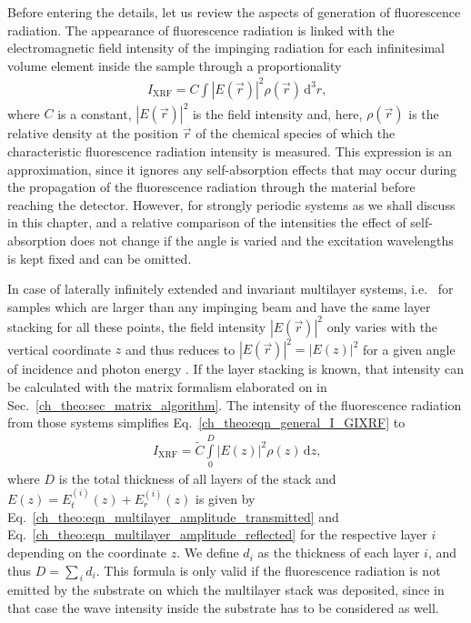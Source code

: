 Before entering the details, let us review the aspects of generation of fluorescence radiation. The appearance of fluorescence radiation is linked with the electromagnetic field intensity of the impinging radiation for each infinitesimal volume element inside the sample through a proportionality
\begin{align}
 I_\text{XRF} = C \int |E(\vec{r})|^2 \rho(\vec{r}) 
\,\text{d}^3 r \text{,} \label{ch_theo:eqn_general_I_GIXRF}
\end{align}
where $C$ is a constant, $|E(\vec{r})|^2$ is the field intensity and, here, $\rho(\vec{r})$ is the relative density at the position $\vec{r}$ of the chemical species of which the characteristic fluorescence radiation intensity is measured. This expression is an approximation, since it ignores any self-absorption effects that may occur during the propagation of the fluorescence radiation through the material before reaching the detector. However, for strongly periodic systems as we shall discuss in this chapter, and a relative comparison of the intensities the effect of self-absorption does not change if the angle is varied and the excitation wavelengths is kept fixed and can be omitted.


In case of laterally infinitely extended and invariant multilayer systems, i.e.~ for samples which are larger than any impinging beam and have the same layer stacking for all these points, the field intensity $|E(\vec{r})|^2$ only varies with the vertical coordinate $z$ and thus reduces to $|E(\vec{r})|^2 = |E(z)|^2$ for a given angle of incidence and photon energy \cite{de_boer_glancing-incidence_1991}. If the layer stacking is known, that intensity can be calculated with the matrix formalism elaborated on in Sec.~\ref{ch_theo:sec_matrix_algorithm}. The intensity of the fluorescence radiation from those systems simplifies Eq.~\eqref{ch_theo:eqn_general_I_GIXRF} to 
\begin{align}
 I_\text{XRF} = \tilde{C} \int\limits_0^{D} |E(z)|^2 \rho(z) 
\,\text{d}z \text{,} \label{ch_theo:eqn_I_GIXRF_multilayer}
\end{align}
where $D$ is the total thickness of all layers of the stack and $E(z) = E^{(i)}_t(z) + E^{(i)}_r(z)$ is given by Eq.~\eqref{ch_theo:eqn_multilayer_amplitude_transmitted} and Eq.~\eqref{ch_theo:eqn_multilayer_amplitude_reflected} for the respective layer $i$ depending on the coordinate $z$. We define $d_i$ as the thickness of each layer $i$, and thus $D = \sum_{\,i} d_i$. This formula is only valid if the fluorescence radiation is not emitted by the substrate on which the multilayer stack was deposited, since in that case the wave intensity inside the substrate has to be considered as well.

